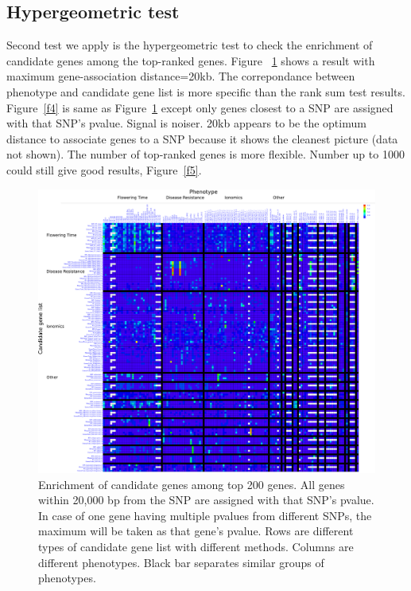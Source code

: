 \documentclass[a4paper,10pt]{article}
\begin{document}
\subsection{Hypergeometric test}

Second test we apply is the hypergeometric test to check the enrichment of candidate genes among the top-ranked genes. Figure ~\ref{f3} shows a result with maximum gene-association distance=20kb. The correpondance between phenotype and candidate gene list is more specific than the rank sum test results.  Figure~\ref{f4} is same as Figure~\ref{f3} except only genes closest to a SNP are assigned with  that SNP's pvalue. Signal is noiser. 20kb appears to be the optimum distance to associate genes to a SNP because it shows the cleanest picture (data not shown). The number of top-ranked genes is more flexible. Number up to 1000 could still give good results, Figure~\ref{f5}.

\begin{figure}
  \includegraphics[width=1\textwidth]{figures/top_snp_test_call_method_17_f200_m20000_inkscape.png}
  \caption{Enrichment of candidate genes among top 200 genes. All genes within 20,000 bp from the SNP are assigned with that SNP's pvalue. In case of one gene having multiple pvalues from different SNPs, the maximum will be taken as that gene's pvalue. Rows are different types of candidate gene list with different methods. Columns are different phenotypes. Black bar separates similar groups of phenotypes.}\label{f3}
\end{figure}
\end{document}

